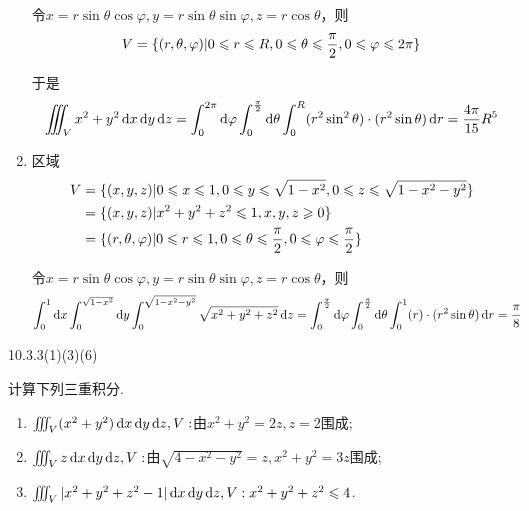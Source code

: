 \begin{solution}
\begin{enumerate}
        令$x = r \sin \theta \cos \varphi, y = r \sin \theta \sin \varphi, z = r \cos \theta$，则
        $$V = \{ (r, \theta, \varphi) | 0 \leqslant r \leqslant R, 0 \leqslant \theta \leqslant \frac{\pi}{2}, 0 \leqslant \varphi \leqslant 2\pi \}$$
        
        于是
        $$
        \iiint_V x^2 + y^2 \operatorname{d\!} x \operatorname{d\!} y \operatorname{d\!} z = \int_0^{2 \pi} \operatorname{d\!} \varphi \int_0^{\frac{\pi}{2}} \operatorname{d\!} \theta \int_0^R (r^2 \sin^2\theta) \cdot (r^2 \sin\theta) \operatorname{d\!} r
        = \frac{4 \pi}{15} R^5
        $$
        \item 区域
        \begin{align*}
            V &= \{ (x,y,z) | 0 \leqslant x \leqslant 1, 0 \leqslant y \leqslant \sqrt{1 - x^2}, 0 \leqslant z \leqslant \sqrt{1 - x^2 - y^2} \} \\
            &= \{ (x,y,z) | x^2 + y^2 + z^2 \leqslant 1, x, y, z \geqslant 0 \}\\
            &= \{ (r, \theta, \varphi) | 0 \leqslant r \leqslant 1, 0 \leqslant \theta \leqslant \frac{\pi}{2}, 0 \leqslant \varphi \leqslant \frac{\pi}{2} \}
        \end{align*}

        令$x = r \sin \theta \cos \varphi, y = r \sin \theta \sin \varphi, z = r \cos \theta$，则
        \begin{align*}
            \int_0^1 \operatorname{d\!} x \int_0^{\sqrt{1-x^2}} \operatorname{d\!} y \int_0^{\sqrt{1-x^2-y^2}} \sqrt{x^2+y^2+z^2} \operatorname{d\!} z 
            &= \int_0^{\frac{\pi}{2}} \operatorname{d\!} \varphi \int_0^{\frac{\pi}{2}} \operatorname{d\!} \theta \int_0^1 (r) \cdot (r^2 \sin \theta) \operatorname{d\!} r = \frac{\pi}{8}
        \end{align*}
    \end{enumerate}
\end{solution}

\begin{exercise}
    {10.3.3(1)(3)(6)}

    计算下列三重积分.
    \begin{enumerate}
        \item $\iiint_V (x^2 + y^2) \operatorname{d\!} x \operatorname{d\!} y \operatorname{d\!} z, V:$由$x^2 + y^2 = 2z, z=2$围成;
        \setcounter{enumi}{2}
        \item $\iiint_V z \operatorname{d\!} x \operatorname{d\!} y \operatorname{d\!} z, V:$由$\sqrt{4-x^2-y^2} = z, x^2 + y^2 = 3z$围成;
        \setcounter{enumi}{5}
        \item $\iiint_V | x^2 +y^2 + z^2 - 1| \operatorname{d\!} x \operatorname{d\!} y \operatorname{d\!} z,V: x^2 + y^2 + z^2 \leqslant 4$.
    \end{enumerate}
\end{exercise}

